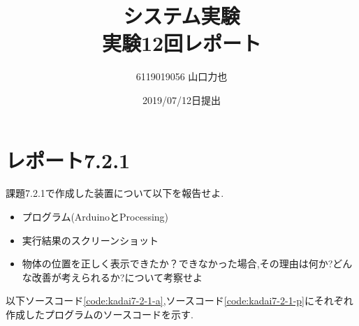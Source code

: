 \documentclass{jarticle}
\title{{システム実験}\\実験12回レポート}
\author{6119019056 山口力也}
\date{2019/07/12日提出}
\begin{document}
\maketitle
\section{レポート7.2.1}
課題7.2.1で作成した装置について以下を報告せよ.
\begin{itemize}
\item プログラム(ArduinoとProcessing)
\item 実行結果のスクリーンショット
\item 物体の位置を正しく表示できたか？できなかった場合,その理由は何か?どんな改善が考えられるか?について考察せよ
\end{itemize}

以下ソースコード\ref{code:kadai7-2-1-a},ソースコード\ref{code:kadai7-2-1-p}にそれぞれ作成したプログラムのソースコードを示す.
\end{document}
